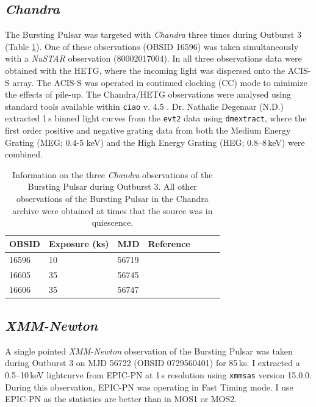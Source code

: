 \subsection{\textit{Chandra}}

\par The Bursting Pulsar was targeted with \textit{Chandra} three times during Outburst 3 (Table \ref{tab:Chandra}).  One of these observations (OBSID 16596) was taken simultaneously with a \textit{NuSTAR} observation (80002017004).  In all three observations data were obtained with the HETG, where the incoming light was dispersed onto the ACIS-S array. The ACIS-S was operated in continued clocking (CC) mode to minimize the effects of pile-up. The  Chandra/HETG observations were analysed using standard tools available within \texttt{ciao} v. 4.5 \citep{Fruscione_Ciao}. Dr. Nathalie Degenaar (\textsf{N.D.}) extracted 1\,s binned light curves from the \texttt{evt2} data using \texttt{dmextract}, where the first order positive and negative grating data from both the Medium Energy Grating (MEG; 0.4-5 keV) and the High Energy Grating (HEG; 0.8--8\,keV) were combined.

\begin{table}
\centering
\begin{tabular}{lllllll}
\hline
\hline
\scriptsize  OBSID &\scriptsize Exposure (ks) &\scriptsize MJD &\scriptsize Reference \\
\hline
16596  	& 10 &  56719      &   \citet{Younes_Expo} \\
16605  	& 35 &   56745    &    \citet{Degenaar_BPSpec}\\
16606  	& 35 &   56747    &    \citet{Degenaar_BPSpec}\\
\hline
\hline
\end{tabular}
\caption[Information on the three \textit{Chandra} observations of the Bursting Pulsar during Outburst 3.]{Information on the three \textit{Chandra} observations of the Bursting Pulsar during Outburst 3.  All other observations of the Bursting Pulsar in the Chandra archive were obtained at times that the source was in quiescence.}
\label{tab:Chandra}
\end{table}

\subsection{\textit{XMM-Newton}}

\par A single pointed \textit{XMM-Newton} observation of the Bursting Pulsar was taken during Outburst 3 on MJD 56722 (OBSID 0729560401) for 85\,ks.  I extracted a 0.5--10\,keV lightcurve from EPIC-PN at 1\,s resolution using \texttt{xmmsas} version 15.0.0.  During this observation, EPIC-PN was operating in Fast Timing mode.  I use EPIC-PN as the statistics are better than in MOS1 or MOS2.


